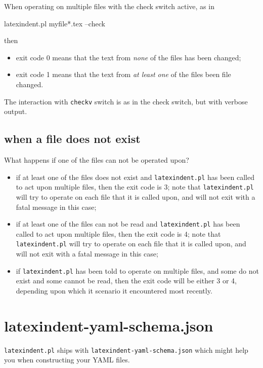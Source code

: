   When operating on multiple files with the check switch active, as in
  \begin{commandshell}
latexindent.pl myfile*.tex --check
        \end{commandshell}
  then
  \begin{itemize}
   \item exit code 0 means that the text from \emph{none} of the files has been changed;
   \item exit code 1 means that the text from \emph{at least one} of the files been file changed.
  \end{itemize}

  The interaction with \texttt{checkv} switch is as in the check switch, but with verbose
  output.

 \subsection{when a file does not exist}
  What happens if one of the files can not be operated upon?
  \begin{itemize}
   \item if at least one of the files does not exist and \texttt{latexindent.pl} has been called
         to act upon multiple files, then the exit code is 3; note that \texttt{latexindent.pl}
         will try to operate on each file that it is called upon, and will not exit with a fatal
         message in this case;
   \item if at least one of the files can not be read and \texttt{latexindent.pl} has been called
         to act upon multiple files, then the exit code is 4; note that \texttt{latexindent.pl}
         will try to operate on each file that it is called upon, and will not exit with a fatal
         message in this case;
   \item if \texttt{latexindent.pl} has been told to operate on multiple files, and some do not
         exist and some cannot be read, then the exit code will be either 3 or 4, depending upon
         which it scenario it encountered most recently.
  \end{itemize}

 \section{latexindent-yaml-schema.json}

  \texttt{latexindent.pl}
   ships with
  \texttt{latexindent-yaml-schema.json}
  which might help you when constructing your YAML files.

